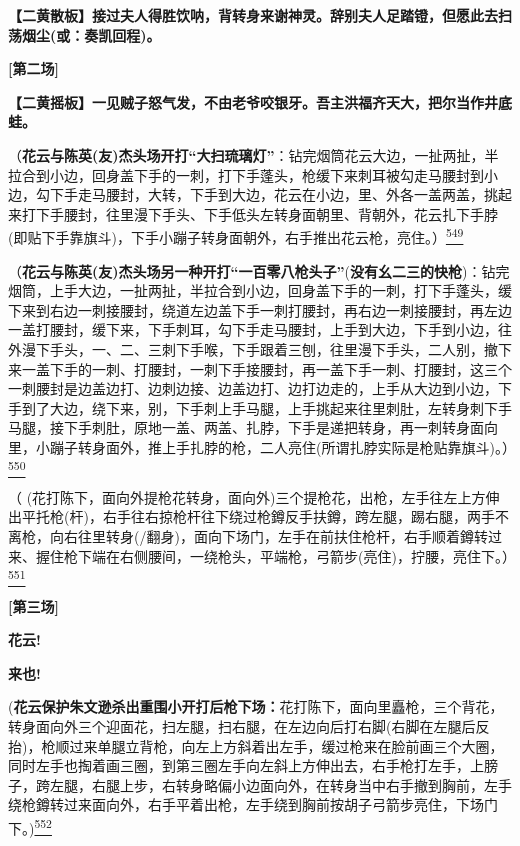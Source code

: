 \textbf{【二黄散板】接过夫人得胜饮呐，背转身来谢神灵。辞别夫人足踏镫，但愿此去扫荡烟尘(或：奏凯回程)。}

\textbf{{[}第二场{]}}

\textbf{【二黄摇板】一见贼子怒气发，不由老爷咬银牙。吾主洪福齐天大，把尔当作井底蛙。}

（\textbf{花云与陈英(友)杰头场开打``大扫琉璃灯''}：钻完烟筒花云大边，一扯两扯，半拉合到小边，回身盖下手的一刺，打下手蓬头，枪缓下来刺耳被勾走马腰封到小边，勾下手走马腰封，大转，下手到大边，花云在小边，里、外各一盖两盖，挑起来打下手腰封，往里漫下手头、下手低头左转身面朝里、背朝外，花云扎下手脖(即贴下手靠旗斗)，下手小蹦子转身面朝外，右手推出花云枪，亮住。）\protect\hyperlink{fn549}{\textsuperscript{549}}

（\textbf{花云与陈英(友)杰头场另一种开打``一百零八枪头子''}(\textbf{没有幺二三的快枪})：钻完烟筒，上手大边，一扯两扯，半拉合到小边，回身盖下手的一刺，打下手蓬头，缓下来到右边一刺接腰封，绕道左边盖下手一刺打腰封，再右边一刺接腰封，再左边一盖打腰封，缓下来，下手刺耳，勾下手走马腰封，上手到大边，下手到小边，往外漫下手头，一、二、三刺下手喉，下手跟着三刨，往里漫下手头，二人别，撤下来一盖下手的一刺、打腰封，一刺下手接腰封，再一盖下手一刺、打腰封，这三个一刺腰封是边盖边打、边刺边接、边盖边打、边打边走的，上手从大边到小边，下手到了大边，绕下来，别，下手刺上手马腿，上手挑起来往里刺肚，左转身刺下手马腿，接下手刺肚，原地一盖、两盖、扎脖，下手是递把转身，再一刺转身面向里，小蹦子转身面外，推上手扎脖的枪，二人亮住(所谓扎脖实际是枪贴靠旗斗)。）\protect\hyperlink{fn550}{\textsuperscript{550}}

（
(花打陈下，面向外提枪花转身，面向外)三个提枪花，出枪，左手往左上方伸出平托枪(杆)，右手往右掠枪杆往下绕过枪鐏反手扶鐏，跨左腿，踢右腿，两手不离枪，向右往里转身(/翻身)，面向下场门，左手在前扶住枪杆，右手顺着鐏转过来、握住枪下端在右侧腰间，一绕枪头，平端枪，弓箭步(亮住)，拧腰，亮住下。）\protect\hyperlink{fn551}{\textsuperscript{551}}

\textbf{{[}第三场{]}}

\textbf{花云!}

\textbf{来也!}

(\textbf{花云保护朱文逊杀出重围小开打后枪下场：}花打陈下，面向里矗枪，三个背花，转身面向外三个迎面花，扫左腿，扫右腿，在左边向后打右脚(右脚在左腿后反抬)，枪顺过来单腿立背枪，向左上方斜着出左手，缓过枪来在脸前画三个大圈，同时左手也掏着画三圈，到第三圈左手向左斜上方伸出去，右手枪打左手，上膀子，跨左腿，右腿上步，右转身略偏小边面向外，在转身当中右手撤到胸前，左手绕枪鐏转过来面向外，右手平着出枪，左手绕到胸前按胡子弓箭步亮住，下场门下。)\protect\hyperlink{fn552}{\textsuperscript{552}}

